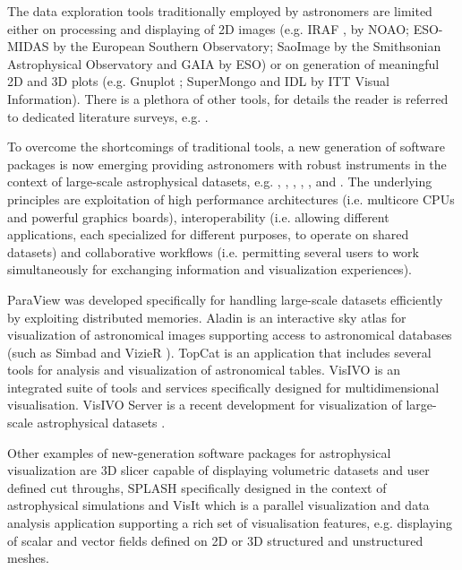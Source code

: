 The data exploration tools traditionally employed by astronomers are
limited either on processing and displaying of 2D images
(e.g. IRAF \cite{iraf}, by NOAO; ESO-MIDAS \cite{midas} by the
European Southern Observatory; SaoImage \cite{sao} by the Smithsonian
Astrophysical Observatory and GAIA \cite{gaia} by ESO) or on
generation of meaningful 2D and 3D plots (e.g. Gnuplot \cite{gnuplot};
SuperMongo \cite{supermongo} and IDL \cite{idl} by ITT Visual
Information). There is a plethora of other tools, for details the
reader is referred to dedicated literature surveys,
e.g. \cite{survey}.

To overcome the shortcomings of traditional tools, a new generation of
software packages is now emerging providing astronomers with robust
instruments in the context of large-scale astrophysical datasets,
e.g. \cite{paraview}, \cite{aladin}, \cite{topcat}, \cite{visivo1}, \cite{3dslicer}, \cite{splash}
and \cite{visit}. The underlying principles are exploitation of high
performance architectures (i.e. multicore CPUs and powerful graphics
boards), interoperability (i.e. allowing different applications, each
specialized for different purposes, to operate on shared datasets) and
collaborative workflows (i.e. permitting several users to work
simultaneously for exchanging information and visualization
experiences).

ParaView \cite{paraview} was developed specifically for handling
large-scale datasets efficiently by exploiting distributed
memories. Aladin \cite{aladin} is an interactive sky atlas for
visualization of astronomical images supporting access to astronomical
databases (such as Simbad \cite{simbad} and
VizieR \cite{vizier}). TopCat \cite{topcat} is an application that
includes several tools for analysis and visualization of astronomical
tables. VisIVO \cite{visivo1} is an integrated suite of tools and
services specifically designed for multidimensional
visualisation. VisIVO Server is a recent development for visualization
of large-scale astrophysical datasets \cite{visivo2}.

Other examples of new-generation software packages for astrophysical
visualization are 3D slicer \cite{3dslicer} capable of displaying
volumetric datasets and user defined cut throughs,
SPLASH \cite{splash} specifically designed in the context of
astrophysical simulations and VisIt \cite{visit} which is a parallel
visualization and data analysis application supporting a rich set of
visualisation features, e.g. displaying of scalar and vector fields
defined on 2D or 3D structured and unstructured meshes. 

